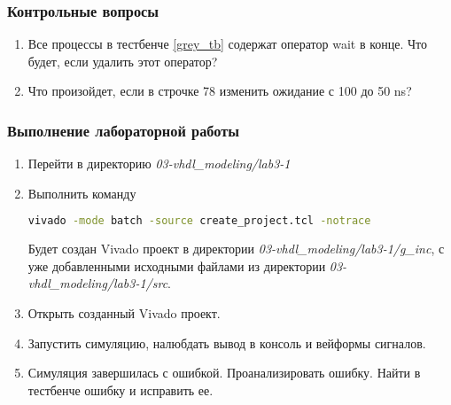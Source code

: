 \subsubsection{Контрольные вопросы} 
\begin{enumerate}
\item Все процессы в тестбенче \ref{grey_tb} содержат оператор wait в конце. Что будет, если удалить этот оператор?
\item Что произойдет, если в строчке 78 изменить ожидание с 100 до 50 ns? 
\end{enumerate}

\subsubsection{Выполнение лабораторной работы} 


\begin{enumerate}
\item Перейти в директорию \emph{03-vhdl\_modeling/lab3-1}
\item Выполнить команду 
\begin{lstlisting}[language = bash]
vivado -mode batch -source create_project.tcl -notrace
\end{lstlisting}
Будет создан Vivado проект в директории \emph{03-vhdl\_modeling/lab3-1/g\_inc}, с уже добавленными исходными файлами из директории \emph{03-vhdl\_modeling/lab3-1/src}.   
\item Открыть созданный Vivado проект.
\item Запустить симуляцию, налюбдать вывод в консоль и вейформы сигналов.
\item Симуляция завершилась с ошибкой. Проанализировать ошибку. Найти в тестбенче ошибку и исправить ее. 
\end{enumerate}
